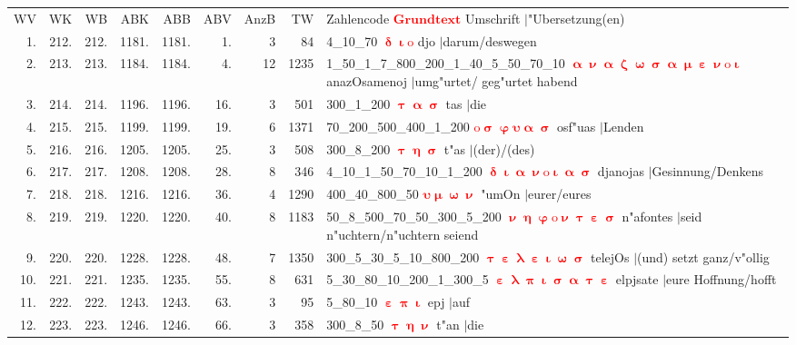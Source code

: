 \documentclass[a4paper,10pt,landscape]{article}
\begin{document}
\begin{tabular}{rrrrrrrrp{120mm}}
WV&WK&WB&ABK&ABB&ABV&AnzB&TW&Zahlencode \textcolor{red}{$\boldsymbol{Grundtext}$} Umschrift $|$"Ubersetzung(en)\\
1.&212.&212.&1181.&1181.&1.&3&84&4\_10\_70 \textcolor{red}{$\boldsymbol{\updelta\upiota\mathrm{o}}$} djo $|$darum/deswegen\\
2.&213.&213.&1184.&1184.&4.&12&1235&1\_50\_1\_7\_800\_200\_1\_40\_5\_50\_70\_10 \textcolor{red}{$\boldsymbol{\upalpha\upnu\upalpha\upzeta\upomega\upsigma\upalpha\upmu\upepsilon\upnu\mathrm{o}\upiota}$} anazOsamenoj $|$umg"urtet/ geg"urtet habend\\
3.&214.&214.&1196.&1196.&16.&3&501&300\_1\_200 \textcolor{red}{$\boldsymbol{\uptau\upalpha\upsigma}$} tas $|$die\\
4.&215.&215.&1199.&1199.&19.&6&1371&70\_200\_500\_400\_1\_200 \textcolor{red}{$\boldsymbol{\mathrm{o}\upsigma\upvarphi\upsilon\upalpha\upsigma}$} osf"uas $|$Lenden\\
5.&216.&216.&1205.&1205.&25.&3&508&300\_8\_200 \textcolor{red}{$\boldsymbol{\uptau\upeta\upsigma}$} t"as $|$(der)/(des)\\
6.&217.&217.&1208.&1208.&28.&8&346&4\_10\_1\_50\_70\_10\_1\_200 \textcolor{red}{$\boldsymbol{\updelta\upiota\upalpha\upnu\mathrm{o}\upiota\upalpha\upsigma}$} djanojas $|$Gesinnung/Denkens\\
7.&218.&218.&1216.&1216.&36.&4&1290&400\_40\_800\_50 \textcolor{red}{$\boldsymbol{\upsilon\upmu\upomega\upnu}$} "umOn $|$eurer/eures\\
8.&219.&219.&1220.&1220.&40.&8&1183&50\_8\_500\_70\_50\_300\_5\_200 \textcolor{red}{$\boldsymbol{\upnu\upeta\upvarphi\mathrm{o}\upnu\uptau\upepsilon\upsigma}$} n"afontes $|$seid n"uchtern/n"uchtern seiend\\
9.&220.&220.&1228.&1228.&48.&7&1350&300\_5\_30\_5\_10\_800\_200 \textcolor{red}{$\boldsymbol{\uptau\upepsilon\uplambda\upepsilon\upiota\upomega\upsigma}$} telejOs $|$(und) setzt ganz/v"ollig\\
10.&221.&221.&1235.&1235.&55.&8&631&5\_30\_80\_10\_200\_1\_300\_5 \textcolor{red}{$\boldsymbol{\upepsilon\uplambda\uppi\upiota\upsigma\upalpha\uptau\upepsilon}$} elpjsate $|$eure Hoffnung/hofft\\
11.&222.&222.&1243.&1243.&63.&3&95&5\_80\_10 \textcolor{red}{$\boldsymbol{\upepsilon\uppi\upiota}$} epj $|$auf\\
12.&223.&223.&1246.&1246.&66.&3&358&300\_8\_50 \textcolor{red}{$\boldsymbol{\uptau\upeta\upnu}$} t"an $|$die\\

\end{tabular}
\end{document}
